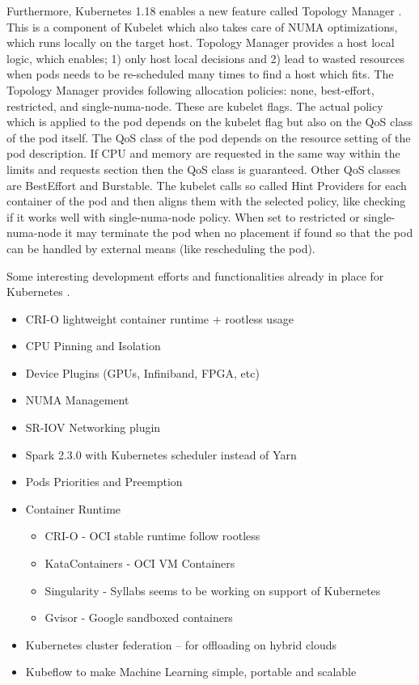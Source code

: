 \documentclass[conference]{IEEEtran}
\begin{document}
Furthermore, Kubernetes 1.18 enables a new feature called Topology Manager \cite{gridengine-topology}. This is a component of Kubelet which also takes care of NUMA optimizations, which runs locally on the target host. Topology Manager provides a host local logic, which enables; 1) only host local decisions and 2) lead to wasted resources when pods needs to be re-scheduled many times to find a host which fits. The Topology Manager provides following allocation policies: none, best-effort, restricted, and single-numa-node. These are kubelet flags. The actual policy which is applied to the pod depends on the kubelet flag but also on the QoS class of the pod itself. The QoS class of the pod depends on the resource setting of the pod description. If CPU and memory are requested in the same way within the limits and requests section then the QoS class is guaranteed. Other QoS classes are BestEffort and Burstable. The kubelet calls so called Hint Providers for each container of the pod and then aligns them with the selected policy, like checking if it works well with single-numa-node policy. When set to restricted or single-numa-node it may terminate the pod when no placement if found so that the pod can be handled by external means (like rescheduling the pod).

Some interesting development efforts and functionalities already in place for Kubernetes \cite{kubecon-2018}.
\begin{itemize}
    \item CRI-O lightweight container runtime + rootless usage
    \item CPU Pinning and Isolation
    \item Device Plugins (GPUs, Infiniband, FPGA, etc)
    \item NUMA Management
    \item SR-IOV Networking plugin
    \item Spark 2.3.0 with Kubernetes scheduler instead of Yarn
    \item Pods Priorities and Preemption
    \item Container Runtime
        \begin{itemize}
        \item CRI-O - OCI stable runtime follow rootless
        \item KataContainers - OCI VM Containers
        \item Singularity - Syllabs seems to be working on support of Kubernetes
        \item Gvisor - Google sandboxed containers
    \end{itemize}
    \item Kubernetes cluster federation – for offloading on hybrid clouds
    \item Kubeflow to make Machine Learning simple, portable and scalable
\end{itemize}
\end{document}
